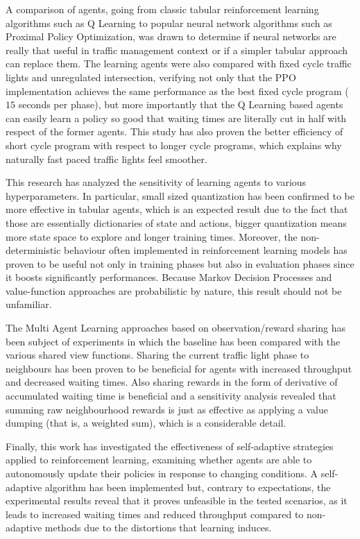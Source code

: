 A comparison of agents, going from classic tabular reinforcement learning algorithms such as Q Learning to popular neural network algorithms such as Proximal Policy Optimization, was drawn to determine if neural networks are really that useful in traffic management context or if a simpler tabular approach can replace them.
The learning agents were also compared with fixed cycle traffic lights and unregulated intersection, verifying not only that the PPO implementation achieves the same performance as the best fixed cycle program ($15$ seconds per phase), but more importantly that the Q Learning based agents can easily learn a policy so good that waiting times are literally cut in half with respect of the former agents.
This study has also proven the better efficiency of short cycle program with respect to longer cycle programs, which explains why naturally fast paced traffic lights feel smoother.

This research has analyzed the sensitivity of learning agents to various hyperparameters.
In particular, small sized quantization has been confirmed to be more effective in tabular agents, which is an expected result due to the fact that those are essentially dictionaries of state and actions, bigger quantization means more state space to explore and longer training times.
Moreover, the non-deterministic behaviour often implemented in reinforcement learning models has proven to be useful not only in training phases but also in evaluation phases since it boosts significantly performances.
Because Markov Decision Processes and value-function approaches are probabilistic by nature, this result should not be unfamiliar.

The Multi Agent Learning approaches based on observation/reward sharing has been subject of experiments in which the baseline has been compared with the various shared view functions.
Sharing the current traffic light phase to neighbours has been proven to be beneficial for agents with increased throughput and decreased waiting times.
Also sharing rewards in the form of derivative of accumulated waiting time is beneficial and a sensitivity analysis revealed that summing raw neighbourhood rewards is just as effective as applying a value dumping (that is, a weighted sum), which is a considerable detail.

Finally, this work has investigated the effectiveness of self-adaptive strategies applied to reinforcement learning, examining whether agents are able to autonomously update their policies in response to changing conditions.
A self-adaptive algorithm has been implemented but, contrary to expectations, the experimental results reveal that it proves unfeasible in the tested scenarios, as it leads to increased waiting times and reduced throughput compared to non-adaptive methods due to the distortions that learning induces.

